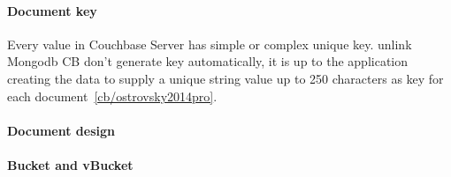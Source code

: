 \paragraph{Document key}
Every value in Couchbase Server has simple or complex   unique key. unlink Mongodb CB don't generate key automatically, it is up to the application creating the data to supply a unique string value up to 250 characters as key for each document~\ref{cb/ostrovsky2014pro}.
\paragraph{Document design}

\paragraph{Bucket and vBucket}